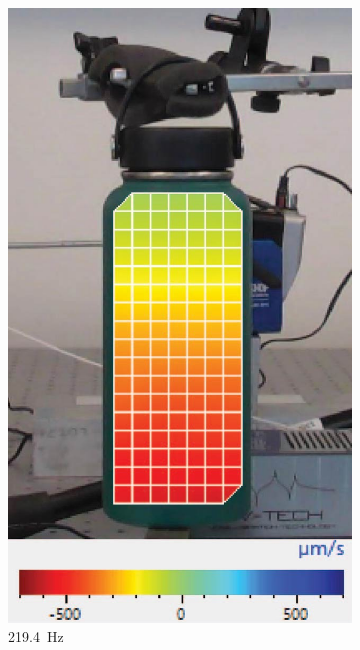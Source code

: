 \documentclass[twoside,a4paper]{article}
\begin{document}
\begin{figure}[!t]
\begin{subfigure}[b]{.32\columnwidth}
         \includegraphics[width=\columnwidth]{Paper/Figures/NoWater_219_4.jpg}
         \caption{219.4\ Hz}
    \end{subfigure}
    \begin{subfigure}[b]{.317\columnwidth}
         \centering

\end{subfigure}
\end{figure}
\end{document}
